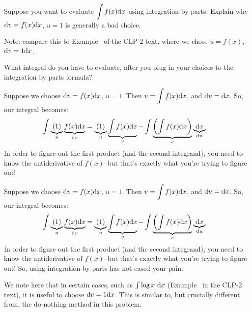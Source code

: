 \begin{question}\label{1.7_badchoices}
Suppose you want to evaluate $\displaystyle\int f(x)\mathrm{d}x$ using integration by parts. Explain why $\mathrm{d}v = f(x)\mathrm{d}x$, $u=1$ is generally a bad choice.

Note: compare this to Example~ of the CLP-2 text, where we chose $u=f(x)$, $\mathrm{d}v=1\mathrm{d}x$.
\end{question}
\begin{hint}
What integral do you have to evaluate, after you plug in your choices to the integration by parts formula?
\end{hint}
\begin{answer}
Suppose we choose $\mathrm{d}v = f(x)\mathrm{d}x$, $u=1$. Then $v = \displaystyle\int f(x)\mathrm{d}x$, and $\mathrm{d}u=\mathrm{d}x$. So, our integral becomes:
\begin{align*}
\int \underbrace{(1)}_{u}\underbrace{f(x)\mathrm{d}x}_{\mathrm{d}v}&=
\underbrace{(1)}_{u}\underbrace{\int f(x)\mathrm{d}x}_{v} - \int\underbrace{ \left(\int f(x)\mathrm{d}x\right)}_{v}\underbrace{\mathrm{d}x}_{\mathrm{d}u}
\end{align*}
In order to figure out the first product (and the second integrand), you need to know the antiderivative of $f(x)$--but that's exactly what you're trying to figure out!
\end{answer}
\begin{solution}
Suppose we choose $\mathrm{d}v = f(x)\mathrm{d}x$, $u=1$. Then $v = \displaystyle\int f(x)\mathrm{d}x$, and $\mathrm{d}u=\mathrm{d}x$. So, our integral becomes:
\begin{align*}
\int \underbrace{(1)}_{u}\underbrace{f(x)\mathrm{d}x}_{\mathrm{d}v}&=
\underbrace{(1)}_{u}\underbrace{\int f(x)\mathrm{d}x}_{v} - \int\underbrace{ \left(\int f(x)\mathrm{d}x\right)}_{v}\underbrace{\mathrm{d}x}_{\mathrm{d}u}
\end{align*}
In order to figure out the first product (and the second integrand), you need to know the antiderivative of $f(x)$--but that's exactly what you're trying to figure out! So, using integration by parts has not eased your pain.

We note here that in certain cases, such as $\int\log x~ \mathrm{d}x$ (Example~  in the CLP-2 text), it is useful to choose $\mathrm{d}v=1\mathrm{d}x$. This is similar to, but crucially different from, the do-nothing method in this problem.
\end{solution}



\subsection*{\Procedural}

